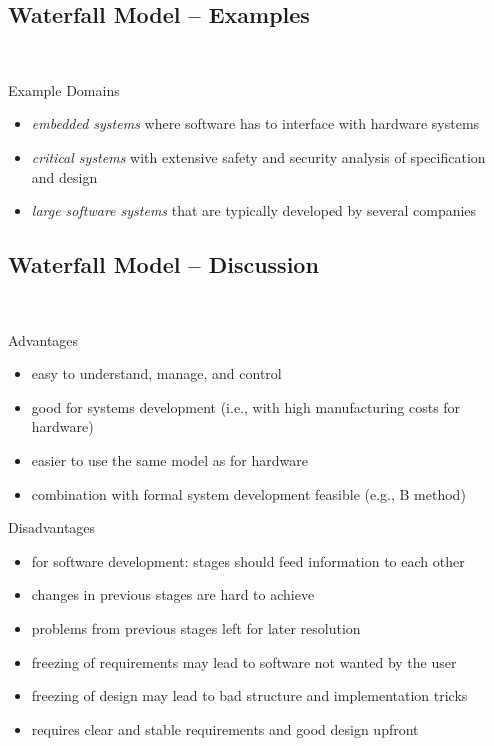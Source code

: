 \subsection{Waterfall Model -- Examples}
\begin{frame}{\insertsubsection\ \mytitlesource{\sommerville}}
	\begin{fancycolumns}[animation=none]
		\begin{example}{Example Domains}
			\begin{itemize}
				\item \emph{embedded systems} where software has to interface with hardware systems
				\item \emph{critical systems} with extensive safety and security analysis of specification and design
				\item \emph{large software systems} that are typically developed by several companies
			\end{itemize}
		\end{example}
		\nextcolumn
	\end{fancycolumns}
\end{frame}

\subsection{Waterfall Model -- Discussion}
\begin{frame}{\insertsubsection\ \mytitlesource{\sommerville}}
	\begin{fancycolumns}
		\begin{note}{Advantages}
			\begin{itemize}
				\item easy to understand, manage, and control
				\item good for systems development (i.e., with high manufacturing costs for hardware)
				\item easier to use the same model as for hardware
				\item combination with formal system development feasible (e.g., B method)
			\end{itemize}
		\end{note}
		\nextcolumn
		\begin{note}{Disadvantages}
				\begin{itemize}
					\item for software development: stages should feed information to each other
					\item changes in previous stages are hard to achieve
					\item problems from previous stages left for later resolution
					\item freezing of requirements may lead to software not wanted by the user
					\item freezing of design may lead to bad structure and implementation tricks
					\item requires clear and stable requirements and good design upfront
				\end{itemize}
		\end{note}
	\end{fancycolumns}
\end{frame}

